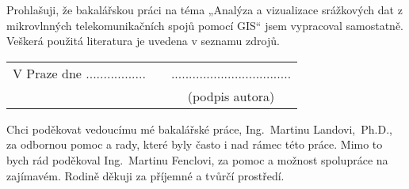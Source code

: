 \newcommand{\odsaditodzhora}{\hskip1pt\vfill}

\odsaditodzhora
{}

 \baselineskip

Prohlašuji, že bakalářskou práci na téma „Analýza a vizualizace
srážkových dat z mikrovlnných telekomunikačních spojů pomocí GIS“ jsem
vypracoval samostatně. Veškerá použitá literatura je uvedena v seznamu
zdrojů.

\begin{flushleft}
\begin{tabular}{cp{}c}
V Praze dne .................
& 
&
..................................
\\
&&
(podpis autora)
\end{tabular}

\end{flushleft}
\newpage

\odsaditodzhora
{}

 \baselineskip

Chci poděkovat vedoucímu mé bakalářské práce, Ing.~Martinu
Landovi,~Ph.D., za odbornou pomoc a rady, které byly často i nad rámec
této práce. Mimo to bych rád poděkoval Ing.~Martinu Fenclovi, za pomoc
a možnost spolupráce na zajímavém. Rodině děkuji za příjemné a tvůrčí
prostředí.

\newpage
